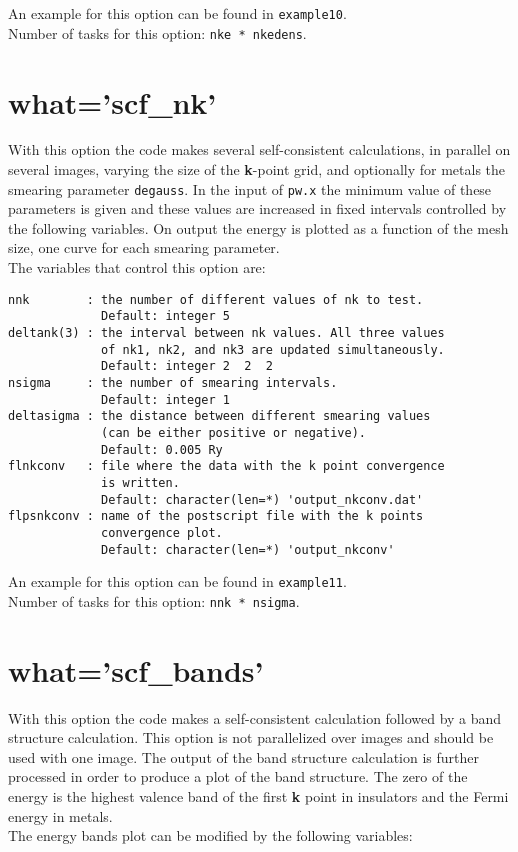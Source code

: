 \documentclass[12pt,a4paper,twoside]{report}
\begin{document}
An example for this option can be found in \texttt{example10}. \\
Number of tasks for this option: \texttt{nke * nkedens}.

\newpage
{\color{coral}\section{what='scf\_nk'}}
\color{black}
With this option the code makes several self-consistent calculations, 
in parallel on several images, varying the size of the {\bf k}-point grid, 
and optionally for metals the smearing parameter \texttt{degauss}. In the 
input of \texttt{pw.x} the minimum value of these parameters is given and 
these values are increased in fixed intervals controlled by the following 
variables. On output the energy is plotted as a function of the mesh size, 
one curve for each smearing parameter.\\
The variables that control this option are:

\begin{verbatim}
nnk        : the number of different values of nk to test.
             Default: integer 5
deltank(3) : the interval between nk values. All three values 
             of nk1, nk2, and nk3 are updated simultaneously.
             Default: integer 2  2  2
nsigma     : the number of smearing intervals.
             Default: integer 1 
deltasigma : the distance between different smearing values
             (can be either positive or negative).
             Default: 0.005 Ry
flnkconv   : file where the data with the k point convergence 
             is written.
             Default: character(len=*) 'output_nkconv.dat'
flpsnkconv : name of the postscript file with the k points 
             convergence plot.
             Default: character(len=*) 'output_nkconv'
\end{verbatim}

An example for this option can be found in \texttt{example11}. \\
Number of tasks for this option: \texttt{nnk * nsigma}.

\newpage
{\color{coral}\section{what='scf\_bands'}}
\color{black}
With this option the code makes a self-consistent calculation followed 
by a band structure calculation. This option is not parallelized over
images and should be used with one image. The output of the band structure 
calculation is further processed in order to produce a plot of the band 
structure.
The zero of the energy is the highest valence band 
of the first {\bf k} point in insulators and the Fermi energy in metals. \\
The energy bands plot can be modified by the following variables:
\end{document}
